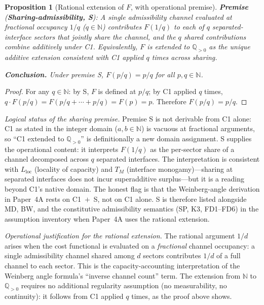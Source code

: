 \documentclass[11pt]{article}
\newtheorem{proposition}[theorem]{Proposition}
\theoremstyle{definition}
\begin{document}
\begin{proposition}[Rational extension of $F$, with operational premise]\label{prop:rational_ext}
\textbf{Premise} (\textbf{Sharing-admissibility, S}): A single
admissibility channel evaluated at fractional occupancy $1/q$ ($q \in \mathbb{N}$)
contributes $F(1/q)$ to each of $q$ separated-interface sectors that
jointly share the channel, and the $q$ shared contributions combine
additively under C1.  Equivalently, $F$ is extended to $\mathbb{Q}_{>0}$
as the unique additive extension consistent with C1 applied $q$ times
across sharing.

\smallskip\noindent\textbf{Conclusion.}  Under premise S, $F(p/q) = p/q$
for all $p, q \in \mathbb{N}$.
\end{proposition}

\begin{proof}
For any $q \in \mathbb{N}$: by S, $F$ is defined at $p/q$; by C1
applied $q$ times, $q \cdot F(p/q) = F(p/q + \cdots + p/q) = F(p) = p$.
Therefore $F(p/q) = p/q$.
\end{proof}

\smallskip\noindent\textit{Logical status of the sharing premise.}\quad
Premise S is not derivable from C1 alone: C1 as stated in the integer
domain ($a, b \in \mathbb{N}$) is vacuous at fractional arguments, so
``C1 extended to $\mathbb{Q}_{>0}$'' is definitionally a new domain
assignment.  S supplies the operational content: it interprets $F(1/q)$
as the per-sector share of a channel decomposed across $q$ separated
interfaces.  The interpretation is consistent with $L_{\mathrm{loc}}$
(locality of capacity) and $T_M$ (interface monogamy)---sharing at
separated interfaces does not incur superadditive surplus---but it is
a reading beyond C1's native domain.  The honest flag is that the
Weinberg-angle derivation in Paper~4A rests on C1~$+$~S, not on C1
alone.  S is therefore listed alongside MD, BW, and the constitutive
admissibility semantics (SP, K3, FD1--FD6) in the assumption inventory
when Paper~4A uses the rational extension.

\noindent\textit{Operational justification for the rational extension.}\quad
The rational argument $1/d$ arises when the cost functional is evaluated
on a \emph{fractional} channel occupancy: a single admissibility channel
shared among $d$ sectors contributes $1/d$ of a full channel to each
sector.  This is the capacity-accounting interpretation of the Weinberg
angle formula's ``inverse channel count'' term.  The extension from
$\mathbb{N}$ to $\mathbb{Q}_{>0}$ requires no additional regularity
assumption (no measurability, no continuity): it follows from C1 applied
$q$ times, as the proof above shows.
\end{document}
